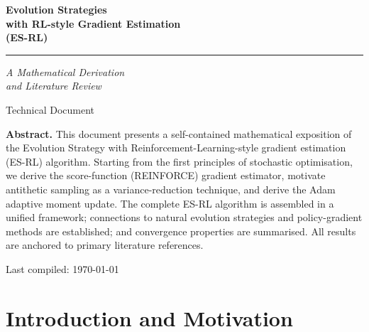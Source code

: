 \documentclass[12pt, a4paper]{article}
\begin{document}
\begin{titlepage}
  \centering
  \vspace*{2cm}

  {\Huge\bfseries\color{MidnightBlue}
    Evolution Strategies\\[0.4em]
    with RL-style Gradient Estimation\\[0.4em]
    (ES-RL)
  }

  \vspace{0.8cm}
  \rule{0.7\linewidth}{1.5pt}

  \vspace{0.8cm}
  {\LARGE\itshape
    A Mathematical Derivation\\[0.3em]
    and Literature Review
  }

  \vspace{1.5cm}
  {\large\color{gray} Technical Document}

  \vspace{3cm}

  \begin{tcolorbox}[
    enhanced, colback=gray!8, colframe=MidnightBlue!40,
    width=0.85\linewidth, center, arc=4pt
  ]
    \textbf{Abstract.}
    This document presents a self-contained mathematical exposition of the
    Evolution Strategy with Reinforcement-Learning-style gradient estimation
    (ES-RL) algorithm.
    Starting from the first principles of stochastic optimisation, we derive
    the score-function (REINFORCE) gradient estimator, motivate antithetic
    sampling as a variance-reduction technique, and derive the Adam adaptive
    moment update.
    The complete ES-RL algorithm is assembled in a unified framework;
    connections to natural evolution strategies and policy-gradient methods
    are established; and convergence properties are summarised.
    All results are anchored to primary literature references.
  \end{tcolorbox}

  \vfill
  {\small Last compiled: \today}
\end{titlepage}

\tableofcontents
\newpage

\section{Introduction and Motivation}
\label{sec:intro}
\end{document}
